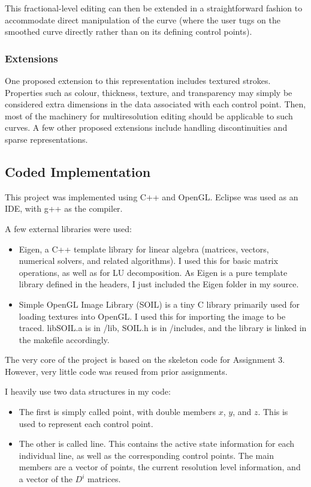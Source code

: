 \documentclass[11pt]{article}
\begin{document}
This fractional-level editing can then be extended in a straightforward fashion to accommodate direct manipulation of the curve (where the user tugs on the smoothed curve directly rather than on its defining control points).

\subsubsection{Extensions}
\label{sec:extensions}
One proposed extension to this representation includes textured strokes. Properties such as colour, thickness, texture, and transparency may simply be considered extra dimensions in the data associated with each control point. Then, most of the machinery for multiresolution editing should be applicable to such curves. A few other proposed extensions include handling discontinuities and sparse representations.

\subsection{Coded Implementation}
\label{sec:codedimplementation}
This project was implemented using C++ and OpenGL. Eclipse was used as an IDE, with g++ as the compiler.

A few external libraries were used:
\begin{itemize}
\item Eigen, a C++ template library for linear algebra (matrices, vectors, numerical solvers, and related algorithms). I used this for basic matrix operations, as well as for LU decomposition. As Eigen is a pure template library defined in the headers, I just included the Eigen folder in my source.
\item Simple OpenGL Image Library (SOIL) is a tiny C library primarily used for loading textures into OpenGL. I used this for importing the image to be traced. libSOIL.a is in /lib, SOIL.h is in /includes, and the library is linked in the makefile accordingly.
\end{itemize}

The very core of the project is based on the skeleton code for Assignment 3. However, very little code was reused from prior assignments.

I heavily use two data structures in my code:
\begin{itemize}
\item The first is simply called point, with double members $x$, $y$, and $z$. This is used to represent each control point.
\item The other is called line. This contains the active state information for each individual line, as well as the corresponding control points. The main members are a vector of points, the current resolution level information, and a vector of the $D^{i}$ matrices.
\end{itemize}
\end{document}
